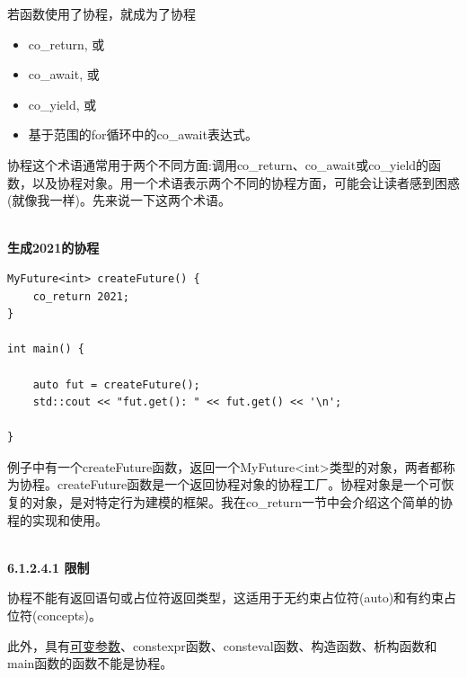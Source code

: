 若函数使用了协程，就成为了协程

\begin{itemize}
\item 
co\_return, 或

\item 
co\_await, 或

\item 
co\_yield, 或

\item 
基于范围的for循环中的co\_await表达式。
\end{itemize}

\begin{tcolorbox}[breakable,enhanced jigsaw,colback=red!5!white,colframe=red!75!black,title={协程工厂和协程对象的区别}]
	
协程这个术语通常用于两个不同方面:调用co\_return、co\_await或co\_yield的函数，以及协程对象。用一个术语表示两个不同的协程方面，可能会让读者感到困惑(就像我一样)。先来说一下这两个术语。

\hspace*{\fill} \\ %
\noindent
\textbf{生成2021的协程}
\begin{lstlisting}[style=styleCXX]
MyFuture<int> createFuture() {
	co_return 2021;
}

int main() {
	
	auto fut = createFuture();
	std::cout << "fut.get(): " << fut.get() << '\n';
	
}
\end{lstlisting}

例子中有一个createFuture函数，返回一个MyFuture<int>类型的对象，两者都称为协程。createFuture函数是一个返回协程对象的协程工厂。协程对象是一个可恢复的对象，是对特定行为建模的框架。我在co\_return一节中会介绍这个简单的协程的实现和使用。
	
\end{tcolorbox}

\hspace*{\fill} \\ %
\noindent
\textbf{6.1.2.4.1 \hspace{0.2cm}限制}

协程不能有返回语句或占位符返回类型，这适用于无约束占位符(auto)和有约束占位符(concepts)。

此外，具有\href{https://en.cppreference.com/w/cpp/language/variadic_arguments}{可变参数}、constexpr函数、consteval函数、构造函数、析构函数和main函数的函数不能是协程。


